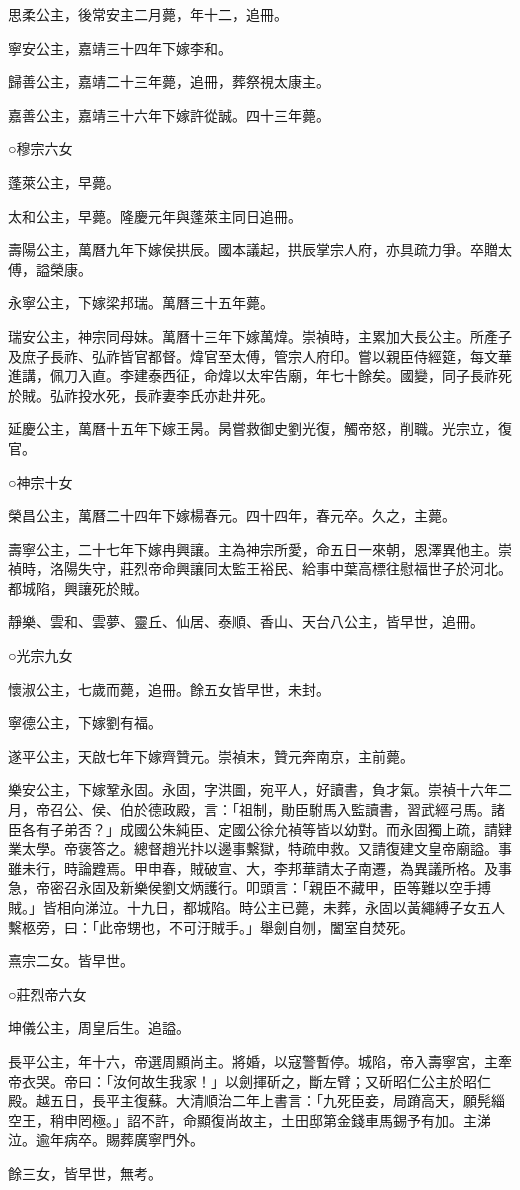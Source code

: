 思柔公主，後常安主二月薨，年十二，追冊。

寧安公主，嘉靖三十四年下嫁李和。

歸善公主，嘉靖二十三年薨，追冊，葬祭視太康主。

嘉善公主，嘉靖三十六年下嫁許從誠。四十三年薨。

○穆宗六女

蓬萊公主，早薨。

太和公主，早薨。隆慶元年與蓬萊主同日追冊。

壽陽公主，萬曆九年下嫁侯拱辰。國本議起，拱辰掌宗人府，亦具疏力爭。卒贈太傅，謚榮康。

永寧公主，下嫁梁邦瑞。萬曆三十五年薨。

瑞安公主，神宗同母妹。萬曆十三年下嫁萬煒。崇禎時，主累加大長公主。所產子及庶子長祚、弘祚皆官都督。煒官至太傅，管宗人府印。嘗以親臣侍經筵，每文華進講，佩刀入直。李建泰西征，命煒以太牢告廟，年七十餘矣。國變，同子長祚死於賊。弘祚投水死，長祚妻李氏亦赴井死。

延慶公主，萬曆十五年下嫁王昺。昺嘗救御史劉光復，觸帝怒，削職。光宗立，復官。

○神宗十女

榮昌公主，萬曆二十四年下嫁楊春元。四十四年，春元卒。久之，主薨。

壽寧公主，二十七年下嫁冉興讓。主為神宗所愛，命五日一來朝，恩澤異他主。崇禎時，洛陽失守，莊烈帝命興讓同太監王裕民、給事中葉高標往慰福世子於河北。都城陷，興讓死於賊。

靜樂、雲和、雲夢、靈丘、仙居、泰順、香山、天台八公主，皆早世，追冊。

○光宗九女

懷淑公主，七歲而薨，追冊。餘五女皆早世，未封。

寧德公主，下嫁劉有福。

遂平公主，天啟七年下嫁齊贊元。崇禎末，贊元奔南京，主前薨。

樂安公主，下嫁鞏永固。永固，字洪圖，宛平人，好讀書，負才氣。崇禎十六年二月，帝召公、侯、伯於德政殿，言：「祖制，勛臣駙馬入監讀書，習武經弓馬。諸臣各有子弟否？」成國公朱純臣、定國公徐允禎等皆以幼對。而永固獨上疏，請肄業太學。帝褒答之。總督趙光抃以邊事繫獄，特疏申救。又請復建文皇帝廟謚。事雖未行，時論韙焉。甲申春，賊破宣、大，李邦華請太子南遷，為異議所格。及事急，帝密召永固及新樂侯劉文炳護行。叩頭言：「親臣不藏甲，臣等難以空手搏賊。」皆相向涕泣。十九日，都城陷。時公主已薨，未葬，永固以黃繩縛子女五人繫柩旁，曰：「此帝甥也，不可汙賊手。」舉劍自刎，闔室自焚死。

熹宗二女。皆早世。

○莊烈帝六女

坤儀公主，周皇后生。追謚。

長平公主，年十六，帝選周顯尚主。將婚，以寇警暫停。城陷，帝入壽寧宮，主牽帝衣哭。帝曰：「汝何故生我家！」以劍揮斫之，斷左臂；又斫昭仁公主於昭仁殿。越五日，長平主復蘇。大清順治二年上書言：「九死臣妾，局蹐高天，願髡緇空王，稍申罔極。」詔不許，命顯復尚故主，土田邸第金錢車馬錫予有加。主涕泣。逾年病卒。賜葬廣寧門外。

餘三女，皆早世，無考。

